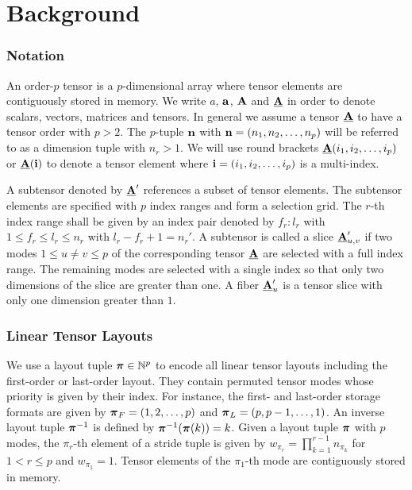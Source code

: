 \section{Background}
\label{sec:preliminaries}

\subsubsection{Notation}
An order-$p$ tensor is a $p$-dimensional array \cite{lim:2017:hypermatrices} where tensor elements are contiguously stored in memory. %
We write $a$, $\mathbf{a}$, $\mathbf{A}$ and $\underline{\mathbf{A}}$ in order to denote scalars, vectors, matrices and tensors. 
In general we assume a tensor $\underline{\mathbf{A}}$ to have a tensor order with $p>2$.
The $p$-tuple $\mathbf{n}$ with $\mathbf{n} = (n_1,n_2,\dots,n_p)$ will be referred to as a dimension tuple with $n_r>1$.
We will use round brackets $\underline{\mathbf{A}}(i_1,i_2,\dots,i_p)$ or $\underline{\mathbf{A}}(\mathbf{i})$ to denote a tensor element where $\mathbf{i} = (i_1,i_2,\dots,i_p)$ is a multi-index.

A subtensor denoted by $\underline{\mathbf{A}}'$ references a subset of tensor elements.
The subtensor elements are specified with $p$ index ranges and form a selection grid.
The $r$-th index range shall be given by an index pair denoted by $f_r \colon l_r$ with $1 \leq f_r \leq l_r \leq n_r$ with $l_r - f_r + 1 = n_r'$.
A subtensor is called a slice $\underline{\mathbf{A}}_{u,v}'$ if two modes $1 \leq u \neq v \leq p$ of the corresponding tensor $\underline{\mathbf{A}}$ are selected with a full index range.
The remaining modes are selected with a single index so that only two dimensions of the slice are greater than one.
A fiber $\underline{\mathbf{A}}_u'$ is a tensor slice with only one dimension greater than $1$.


\subsubsection{Linear Tensor Layouts}
We use a layout tuple $\boldsymbol{\pi} \in \mathbb{N}^p$ to encode all linear tensor layouts including the first-order or last-order layout.
They contain permuted tensor modes whose priority is given by their index.
For instance, the first- and last-order storage formats are given by $\boldsymbol{\pi}_F = (1,2,\dots,p)$ and $\boldsymbol{\pi}_{L} = (p,p-1,\dots,1)$.
An inverse layout tuple $\boldsymbol{\pi}^{-1}$ is defined by $\boldsymbol{\pi}^{-1}(\boldsymbol{\pi}(k)) = k$.
Given a layout tuple $\boldsymbol{\pi}$ with $p$ modes, the $\pi_r$-th element of a stride tuple is given by $w_{\pi_r} = \prod_{k=1}^{r-1} n_{\pi_k}$ for $1 < r \leq p$ and $w_{\pi_1} = 1$.
Tensor elements of the $\pi_1$-th mode are contiguously stored in memory.

